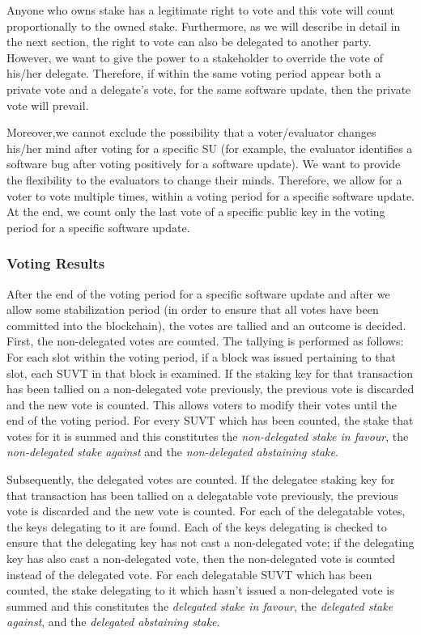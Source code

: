 Anyone who owns stake has a legitimate right to vote and this vote will count proportionally to the owned stake. Furthermore, as we will describe in detail in the next section, the right to vote can also be delegated to another party. However, we want to give the power to a stakeholder to override the vote of his/her delegate. Therefore, if within the same voting period appear both a private vote and a delegate's vote, for the same software update, then the private vote will prevail.

Moreover,we cannot exclude the possibility that a voter/evaluator changes his/her mind after voting for a specific SU (for example, the evaluator identifies a software bug after voting positively for a software update). We want to provide the flexibility to the evaluators to change their minds. Therefore, we allow for a voter to vote multiple times, within a voting period for a specific software update. At the end, we count only the last vote of a specific public key in the voting period for a specific software update.

\subsubsection{Voting Results}
After the end of the voting period for a specific software update and after we allow some stabilization period (in order to ensure that all votes have been committed into the blockchain), the votes are tallied and an outcome is decided. First, the non-delegated votes are counted. The tallying is performed as follows: For each slot within the voting period, if a block was issued pertaining to that slot, each SUVT in that block is examined. If the staking key for that transaction has been tallied on a non-delegated vote previously, the previous vote is discarded and the new vote is counted. This allows voters to modify their votes until the end of the voting period. For every SUVT which has been counted, the stake that votes for it is summed and this constitutes the \emph{non-delegated stake in favour}, the \emph{non-delegated stake against} and the \emph{non-delegated abstaining stake}.

Subsequently, the delegated votes are counted. %
If the delegatee staking key for that transaction has been tallied on a delegatable vote previously, the previous vote is discarded and the new vote is counted. For each of the delegatable votes, the keys delegating to it are found. Each of the keys delegating is checked to ensure that the delegating key has not cast a non-delegated vote; if the delegating key has also cast a non-delegated vote, then the non-delegated vote is counted instead of the delegated vote. For each delegatable SUVT which has been counted, the stake delegating to it which hasn't issued a non-delegated vote is summed and this constitutes the \emph{delegated stake in favour}, the \emph{delegated stake against}, and the \emph{delegated abstaining stake}.

